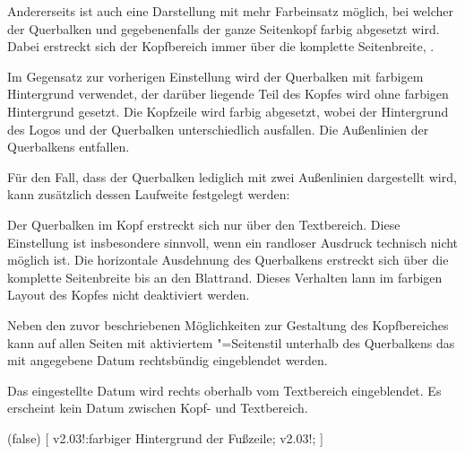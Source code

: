 \begin{DeclareEntity*}{}
\begin{DeclareEntity*}{}
\begin{DeclareEntity*}{}
\begin{Declaration}
Andererseits ist auch eine Darstellung mit mehr Farbeinsatz möglich, bei 
welcher der Querbalken und gegebenenfalls der ganze Seitenkopf farbig 
abgesetzt wird. Dabei erstreckt sich der Kopfbereich immer über die komplette 
Seitenbreite, .
\begin{DeclareValues}{}
  Im Gegensatz zur vorherigen Einstellung wird der Querbalken mit farbigem 
  Hintergrund verwendet, der darüber liegende Teil des Kopfes wird ohne 
  farbigen Hintergrund gesetzt.
  Die Kopfzeile wird farbig abgesetzt, wobei der Hintergrund des Logos und der 
  Querbalken unterschiedlich ausfallen. Die Außenlinien der Querbalkens 
  entfallen.
\end{DeclareValues}

Für den Fall, dass der Querbalken lediglich mit zwei Außenlinien dargestellt 
wird, kann zusätzlich dessen Laufweite festgelegt werden:
\begin{DeclareValues}{}
  Der Querbalken im Kopf erstreckt sich nur über den Textbereich. Diese 
  Einstellung ist insbesondere sinnvoll, wenn ein randloser Ausdruck technisch 
  nicht möglich ist. 
  Die horizontale Ausdehnung des Querbalkens erstreckt sich über die komplette 
  Seitenbreite bis an den Blattrand. Dieses Verhalten lann im farbigen Layout 
  des Kopfes nicht deaktiviert werden.
\end{DeclareValues}

%
Neben den zuvor beschriebenen Möglichkeiten zur Gestaltung des Kopfbereiches 
kann auf allen Seiten mit aktiviertem "=Seitenstil 
unterhalb des Querbalkens das mit  angegebene Datum rechtsbündig 
eingeblendet werden.
\begin{DeclareValues}[Datum]{}
  Das eingestellte Datum wird rechts oberhalb vom Textbereich eingeblendet.
  Es erscheint kein Datum zwischen Kopf- und Textbereich.
\end{DeclareValues}
\end{Declaration}

\begin{Declaration}
  {}
  (false)
[%
  v2.03!:farbiger Hintergrund der Fußzeile;%
  v2.03!;%
]


\end{Declaration}
\end{DeclareEntity*}
\end{DeclareEntity*}
\end{DeclareEntity*}
